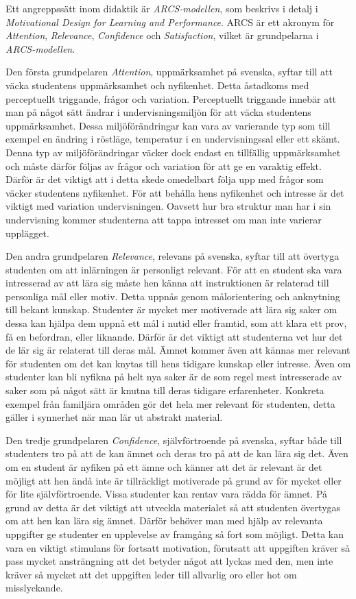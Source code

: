 \documentclass[]{article}
\begin{document}
Ett angreppssätt inom didaktik är \textit{ARCS-modellen},
som beskrivs i detalj i
\textit{Motivational Design for Learning and Performance}.
ARCS är ett akronym för \textit{Attention}, \textit{Relevance},
\textit{Confidence} och \textit{Satisfaction}, vilket är grundpelarna
i \textit{ARCS-modellen}.

Den första grundpelaren \textit{Attention}, uppmärksamhet på svenska,
syftar till att väcka studentens uppmärksamhet och nyfikenhet.
Detta åstadkoms med perceptuellt triggande, frågor och variation.
Perceptuellt triggande innebär att man på något sätt ändrar i
undervisningsmiljön för att väcka studentens uppmärksamhet.
Dessa miljöförändringar kan vara av varierande typ som till exempel en ändring
i röstläge, temperatur i en undervisningssal eller ett skämt.
Denna typ av miljöförändringar väcker dock endast en tillfällig uppmärksamhet
och måste därför följas av frågor och variation för att ge en varaktig effekt.
Därför är det viktigt att i detta skede omedelbart följa upp med frågor som väcker
studentens nyfikenhet. För att behålla hens nyfikenhet och
intresse är det viktigt med variation undervisningen.
Oavsett hur bra struktur man har i sin undervisning kommer studenterna att tappa
intresset om man inte varierar upplägget.

Den andra grundpelaren \textit{Relevance}, relevans på svenska,
syftar till att övertyga studenten om att inlärningen är personligt relevant.
För att en student ska vara intresserad av att lära sig måste hen känna
att instruktionen är relaterad till personliga mål eller motiv.
Detta uppnås genom målorientering och anknytning till bekant kunskap.
Studenter är mycket mer motiverade att lära sig saker om dessa kan hjälpa dem
uppnå ett mål i nutid eller framtid, som att klara ett prov, få en befordran,
eller liknande. Därför är det viktigt att studenterna vet hur det de lär sig är
relaterat till deras mål. Ämnet kommer även att kännas mer relevant för studenten
om det kan knytas till hens tidigare kunskap eller intresse. Även om studenter kan
bli nyfikna på helt nya saker är de som regel mest intresserade av saker som på
något sätt är knutna till deras tidigare erfarenheter.
Konkreta exempel från familjära områden gör det hela mer relevant för studenten,
detta gäller i synnerhet när man lär ut abstrakt material.

Den tredje grundpelaren \textit{Confidence}, självförtroende på svenska,
syftar både till studenters tro på att de kan ämnet och deras tro på att
de kan lära sig det. Även om en student är nyfiken på ett ämne och känner
att det är relevant är det möjligt att hen ändå inte är tillräckligt
motiverade på grund av för mycket eller för lite självförtroende.
Vissa studenter kan rentav vara rädda för ämnet. På grund av detta är det
viktigt att utveckla materialet så att studenten övertygas om att hen kan
lära sig ämnet. Därför behöver man med hjälp av relevanta uppgifter ge studenter
en upplevelse av framgång så fort som möjligt. Detta kan vara en viktigt
stimulans för fortsatt motivation, förutsatt att uppgiften kräver så pass
mycket ansträngning att det betyder något att lyckas med den, men inte kräver
så mycket att det uppgiften leder till allvarlig oro eller hot om misslyckande.
\end{document}
